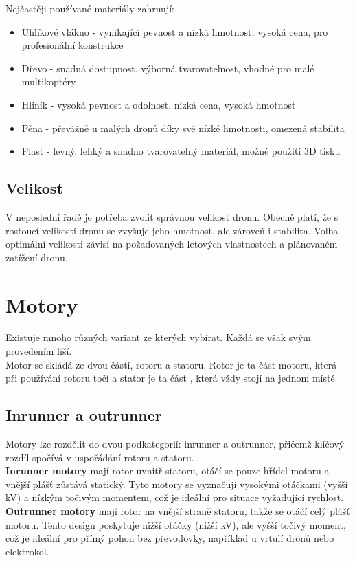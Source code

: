 \documentclass[12pt]{report}
\begin{document}
Nejčastěji používané materiály zahrnují:
\begin{itemize}
	\item Uhlíkové vlákno - vynikající pevnost a nízká hmotnost, vysoká cena, pro profesionální konstrukce
	\item Dřevo - snadná dostupnost, výborná tvarovatelnost, vhodné pro malé multikoptéry
	\item Hliník - vysoká pevnost a odolnost, nízká cena, vysoká hmotnost
	\item Pěna - převážně u malých dronů díky své nízké hmotnosti, omezená stabilita
	\item Plast - levný, lehký a snadno tvarovatelný materiál, možné použití 3D tisku
\end{itemize}

\subsection{Velikost}
V neposlední řadě je potřeba zvolit správnou velikost dronu.  Obecně platí, že s rostoucí velikostí dronu se zvyšuje jeho hmotnost, ale zároveň i stabilita. Volba optimální velikosti závisí na požadovaných letových vlastnostech a plánovaném zatížení dronu.

\section{Motory}
Existuje mnoho různých variant ze kterých vybírat. Každá se však svým provedením liší.\\
Motor se skládá ze dvou částí, rotoru a statoru. Rotor je ta část motoru, která při používání rotoru točí a stator je ta část , která vždy stojí na jednom místě.


\subsection{Inrunner a outrunner}
Motory lze rozdělit do dvou podkategorií: inrunner a outrunner, přičemž klíčový rozdíl spočívá v uspořádání rotoru a statoru.\\
\textbf{Inrunner motory} mají rotor uvnitř statoru, otáčí se pouze hřídel motoru a vnější plášť zůstává statický. Tyto motory se vyznačují vysokými otáčkami (vyšší kV) a nízkým točivým momentem, což je ideální pro situace vyžadující rychlost.\\
\textbf{Outrunner motory} mají rotor na vnější straně statoru, takže se otáčí celý plášť motoru. Tento design poskytuje nižší otáčky (nižší kV), ale vyšší točivý moment, což je ideální pro přímý pohon bez převodovky, například u vrtulí dronů nebo elektrokol. 
\end{document}

